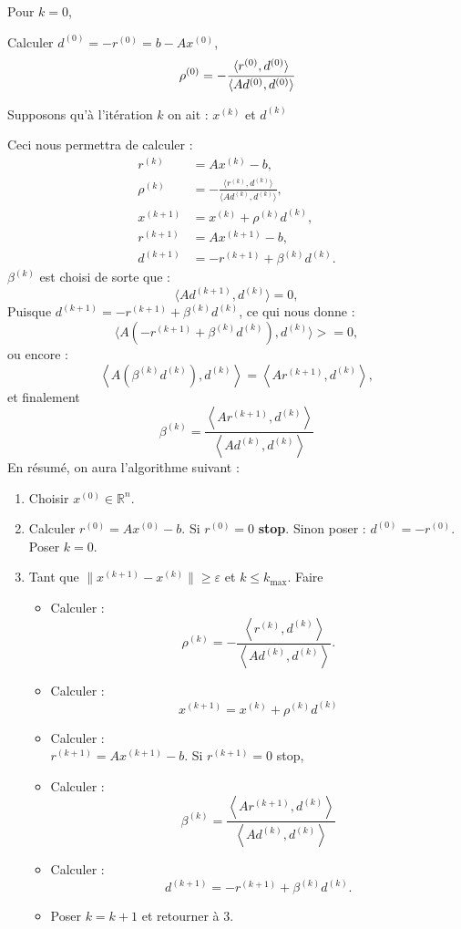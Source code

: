 \documentclass[12pt,a4paper,openay]{book}
\numberwithin{equation}{chapter}
\newcommand{\R}{\mathbb{R}}
\newcommand{\dk}{d^{(k)}}
\newcommand{\dks}{d^{(k+1)}}
\newcommand{\xk}{x^{(k)}}
\newcommand{\xks}{x^{(k+1)}}
\newcommand{\rk}{r^{(k)}}
\newcommand{\bk}{\beta^{(k)}}
\newcommand{\rks}{r^{(k+1)}}
\newcommand{\rok}{\rho^{(k)}}
\newcommand{\li}{\left<}
\newcommand{\rs}{\right>}
\begin{document}
	Pour $k=0$,
	
	Calculer $d^{(0)}=-r^{(0)}=b-Ax^{(0)}$,
	$$
	\rho^{(0)}=-\cfrac{\langle r^{(0)},d^{(0)}\rangle }{\langle Ad^{(0)},d^{(0)}\rangle }
	$$
	
	Supposons qu'\`a l'it\'eration $k$ on ait : $x^{(k)}$ et $d^{(k)}$
	
	Ceci nous permettra de calculer :
	$$\begin{aligned}	
	\rk &=A \xk -b,\\
	\rok &=-\frac{\langle \rk,\dk\rangle }{\langle A\dk,\dk\rangle },\\
	\xks &=\xk +\rok \dk,\\
	\rks &=A\xks -b,\\
	\dks &=-\rks +\bk\dk.
	\end{aligned}
	$$
	$\bk$ est choisi de sorte que :
	$$
	\langle A\dks,\dk\rangle =0,
	$$
	Puisque $\dks=-\rks+\bk\dk$, ce qui nous donne :
	$$
	\langle A\left(-\rks +\bk\dk\right), \dk \rangle>=0,
	$$
	ou encore :
	$$
	\li A\left(\bk\dk\right),\dk\rs =\li A\rks,\dk\rs,
	$$
	et finalement 
	$$
	\bk=\frac{\li A\rks,\dk\rs}{\li A\dk,\dk\rs}
	$$
	En r\'esum\'e, on aura l'algorithme suivant :
	
	\begin{enumerate}
		\item Choisir $x^{(0)}\in\R^n$.
		\item Calculer $r^{(0)}=Ax^{(0)}-b$. Si $r^{(0)}=0$ \textbf{stop}. Sinon poser : $d^{(0)}=-r^{(0)}$. Poser $k=0$.\\
		\item Tant que $\lVert \xks -\xk\rVert\geq \varepsilon$ et $k\leq k_{\max}$. Faire 
		\begin{itemize}
			\item  Calculer :
			$$\rok =-\frac{\li \rk,\dk\rs}{\li A\dk,\dk\rs}.$$
			\item Calculer :
			$$
			\xks =\xk+\rok\dk$$
			\item Calculer :\\
			$\rks =A\xks -b	$. Si $\rks=0$ stop,\\
			\item Calculer :
			$$\bk =\frac{\li A\rks, \dk\rs}{\li A\dk,\dk\rs}$$
			\item Calculer :
			$$ \dks=-\rks +\bk\dk.$$
			\item Poser $k=k+1$ et retourner \`a $3$.
		\end{itemize}	
	\end{enumerate}
	
\end{document}
